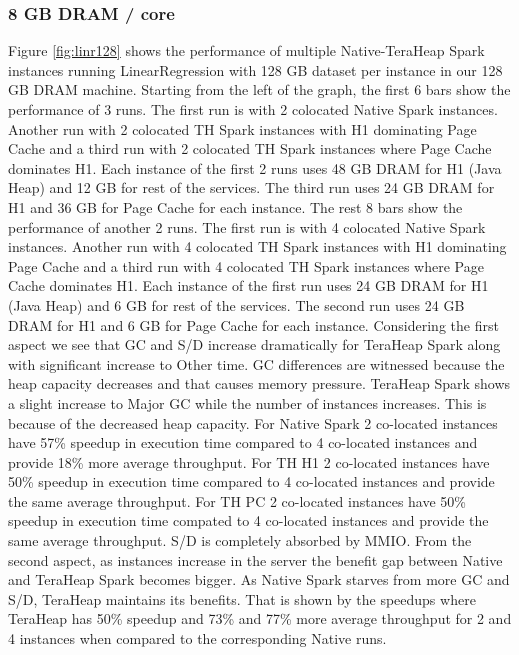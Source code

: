 \subsubsection{8 GB DRAM / core}

Figure \ref{fig:linr128} shows the performance of multiple
Native-TeraHeap Spark instances running LinearRegression with 128 GB
dataset per instance in our 128 GB DRAM machine.
Starting from the left of the graph, the first 6 bars show the
performance of 3 runs. The first run is with 2 colocated Native Spark instances.
Another run with 2 colocated TH Spark instances with H1 dominating Page Cache
and a third run with 2 colocated TH Spark instances where Page Cache dominates H1.
Each instance of the first 2 runs uses 48 GB DRAM for H1 (Java Heap) and 12 GB for rest of the services.
The third run uses 24 GB DRAM for H1 and 36 GB for Page Cache for each instance.
The rest 8 bars show the performance of another 2 runs. The first run is with 4 colocated Native Spark instances.
Another run with 4 colocated TH Spark instances with H1 dominating Page Cache
and a third run with 4 colocated TH Spark instances where Page Cache dominates H1.
Each instance of the first run uses 24 GB DRAM for H1 (Java Heap) and 6 GB for rest of the services.
The second run uses 24 GB DRAM for H1 and 6 GB for Page Cache for each instance.
Considering the first aspect we see that GC and S/D increase dramatically for TeraHeap Spark along with significant increase to Other time. GC differences are witnessed because the heap capacity decreases and that causes memory pressure. TeraHeap Spark shows a slight increase to Major GC while the number of instances increases. This is because of the decreased heap capacity. For Native Spark 2 co-located instances have 57\% speedup in execution time compared to 4 co-located instances and provide 18\% more average throughput. For TH H1 2 co-located instances have 50\% speedup in execution time compared to 4 co-located instances and provide the same average throughput. For TH PC 2 co-located instances have 50\% speedup in execution time compated to 4 co-located instances and provide the same average throughput. 
S/D is completely absorbed by MMIO. From the second aspect, as instances increase in the server the benefit gap between Native and TeraHeap Spark becomes bigger. As Native Spark starves from more GC and S/D, TeraHeap maintains its benefits. That is shown by the speedups where TeraHeap has 50\% speedup and 73\% and 77\% more average throughput for 2 and 4 instances when compared to the corresponding Native runs.

